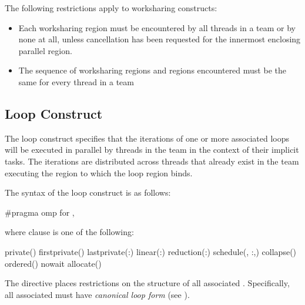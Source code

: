 \begin{samepage}
\restrictions
The following restrictions apply to worksharing constructs:

\begin{itemize}
\item Each worksharing region must be encountered by all threads in a team or by none at
all, unless cancellation has been requested for the innermost enclosing parallel
region.

\item The sequence of worksharing regions and  regions encountered must be the
same for every thread in a team
\end{itemize}
\end{samepage}










\subsection{Loop Construct}
\label{subsec:Loop Construct}
\summary
The loop construct specifies that the iterations of one or more associated loops will be
executed in parallel by threads in the team in the context of their implicit tasks. The
iterations are distributed across threads that already exist in the team executing the
 region to which the loop region binds.

\syntax
\begin{ccppspecific}
The syntax of the loop construct is as follows:

\begin{ompcPragma}
#pragma omp for \plc{[clause[ [},\plc{] clause] ... ] new-line}
\end{ompcPragma}

where clause is one of the following:

\begin{indentedcodelist}
private()
firstprivate()
lastprivate(\plc{[ lastprivate-modifier}:\plc{] list})
linear(\plc{list[ }:\plc{ linear-step]})
reduction(:)
schedule(\plc{[modifier [}, \plc{modifier]}:\plc{]kind[},\plc{ chunk_size]})
collapse()
ordered\plc{[}()\plc{]}
nowait
allocate(\plc{[allocator: ]})
\end{indentedcodelist}

The  directive places restrictions on the structure of all associated .
Specifically, all associated  must have \emph{canonical loop form} (see
).
\end{ccppspecific}

